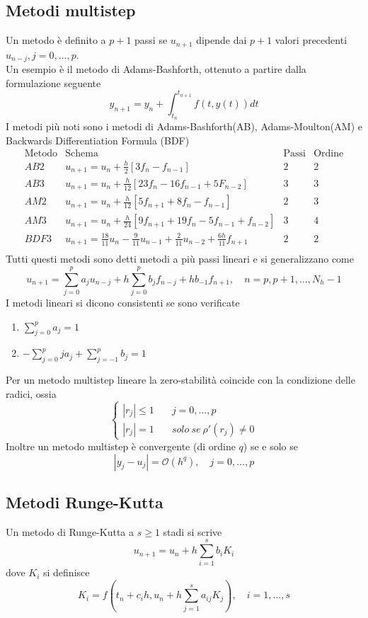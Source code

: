 \documentclass[a4paper,12pt]{article}
\begin{document}
\subsection{Metodi multistep}
Un metodo è definito a $p+1$ passi se $u_{n+1}$ dipende dai $p + 1$ valori precedenti $u_{n-j}, j = 0, \ldots, p$. \\
Un esempio è il metodo di Adams-Bashforth, ottenuto a partire dalla formulazione seguente
$$
y_{n+1} = y_n + \int_{t_n}^{t_{n+1}} f(t, y(t))dt
$$
I metodi più noti sono i metodi di Adams-Bashforth(AB), Adams-Moulton(AM) e Backwards Differentiation Formula (BDF)
$$
\begin{array}{cccc}
\mathrm{Metodo} & \mathrm{Schema} &\mathrm{Passi} & \mathrm{Ordine} \\
AB2 & u_{n+1} = u_n +\frac{h}{2}[3f_n - f_{n-1}] & 2 & 2 \\
AB3 & u_{n+1} = u_n +\frac{h}{12}[23f_n - 16f_{n-1}+5F_{n-2}] & 3 & 3 \\
AM2 & u_{n+1} = u_n +\frac{h}{12}[5f_{n+1} + 8f_n - f_{n-1}] & 2 & 3 \\
AM3 & u_{n+1} = u_n +\frac{h}{24}[9f_{n+1} + 19f_n - 5f_{n-1} + f_{n-2}] & 3 & 4 \\
BDF3 & u_{n+1} = \frac{18}{11}u_n -\frac{9}{11}u_{n-1} + \frac{2}{11} u_{n-2} +\frac{6h}{11}f_{n+1} & 2 & 2 \\


\end{array}
$$
Tutti questi metodi sono detti metodi a più passi lineari e si generalizzano come
$$
u_{n+1} = \sum\limits_{j=0}^p a_ju_{n-j} + h\sum\limits_{j=0}^p b_j f_{n-j} + h b_{-1}f_{n+1}, \quad n=p,p+1, \ldots, N_h-1
$$
I metodi lineari si dicono consistenti se sono verificate
\begin{enumerate}
\item $\sum\limits_{j=0}^pa_j = 1$
\item $-\sum\limits_{j = 0}^pja_j + \sum\limits_{j=-1}^pb_j = 1$
\end{enumerate}
Per un metodo multistep lineare la zero-stabilità coincide con la condizione delle radici, ossia
$$
\begin{cases}
|r_j| \leq 1 \quad  & j = 0, \ldots, p \\
|r_j| = 1 \quad & solo \ se \ \rho'(r_j) \neq 0
\end{cases}
$$
Inoltre un metodo multistep è convergente (di ordine $q$) se e solo se 
$$ 
|y_j - u_j| = \mathcal{O}(h^q), \quad j = 0,\ldots, p 
$$
\subsection{Metodi Runge-Kutta}
Un metodo di Runge-Kutta a $s \geq 1$ stadi si scrive 
$$
u_{n+1} = u_n + h\sum\limits_{i=1}^s b_iK_i
$$
dove $K_i$ si definisce
$$
K_i = f \left(t_n +c_ih, u_n+h\sum\limits_{j=1}^s a_{ij}K_j \right), \quad i = 1, \ldots, s
$$
\end{document}
